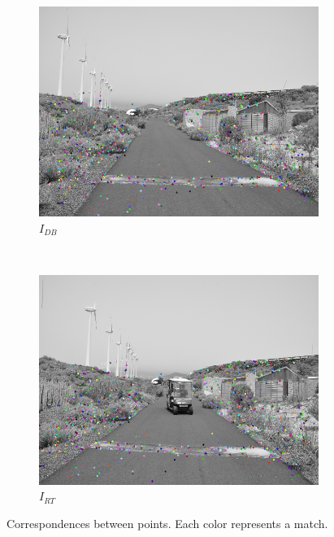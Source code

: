 \begin{figure}[h!]
        \centering
        \begin{subfigure}[b]{0.45\textwidth}
                \centering
                \includegraphics[width=\textwidth]{matches1}
                \caption{$I_{DB}$}\label{fig:cp01_matches_1}
        \end{subfigure}%
        ~ %
        \begin{subfigure}[b]{0.45\textwidth}
                \centering
                \includegraphics[width=\textwidth]{matches2}
                \caption{$I_{RT}$}\label{fig:cp01_matches_2}
        \end{subfigure}%
        \caption{Correspondences between points. Each color represents a match.}\label{fig:cp01_matches}
\end{figure}

